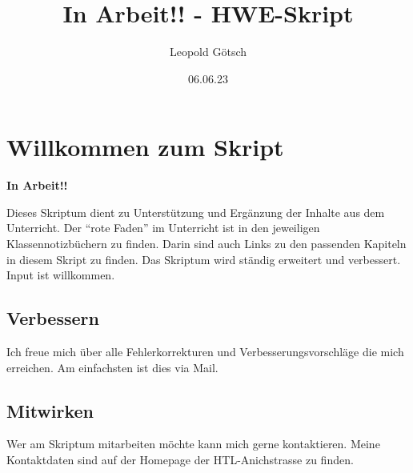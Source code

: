 \documentclass[
  letterpaper,
  DIV=11]{scrreprt}
\title{In Arbeit!! - HWE-Skript}
\author{Leopold Götsch}
\date{06.06.23}
\renewcommand*\contentsname{Inhaltsverzeichnis}
\newcommand\contentsname{Inhaltsverzeichnis}
\begin{document}
\maketitle
\ifdefined\Shaded\renewenvironment{Shaded}{\begin{tcolorbox}[enhanced, breakable, interior hidden, sharp corners, frame hidden, borderline west={3pt}{0pt}{shadecolor}, boxrule=0pt]}{\end{tcolorbox}}\fi

\renewcommand*\contentsname{Inhaltsverzeichnis}
{
\hypersetup{linkcolor=}
\setcounter{tocdepth}{2}
\tableofcontents
}

\hypertarget{willkommen-zum-skript}{%
\chapter*{Willkommen zum Skript}\label{willkommen-zum-skript}}


\textbf{In Arbeit!!}

Dieses Skriptum dient zu Unterstützung und Ergänzung der Inhalte aus dem
Unterricht. Der ``rote Faden'' im Unterricht ist in den jeweiligen
Klassennotizbüchern zu finden. Darin sind auch Links zu den passenden
Kapiteln in diesem Skript zu finden. Das Skriptum wird ständig erweitert
und verbessert. Input ist willkommen.

\hypertarget{verbessern}{%
\section*{Verbessern}\label{verbessern}}


Ich freue mich über alle Fehlerkorrekturen und Verbesserungsvorschläge
die mich erreichen. Am einfachsten ist dies via Mail.

\hypertarget{mitwirken}{%
\section*{Mitwirken}\label{mitwirken}}


Wer am Skriptum mitarbeiten möchte kann mich gerne kontaktieren. Meine
Kontaktdaten sind auf der Homepage der HTL-Anichstrasse zu finden.
\end{document}
